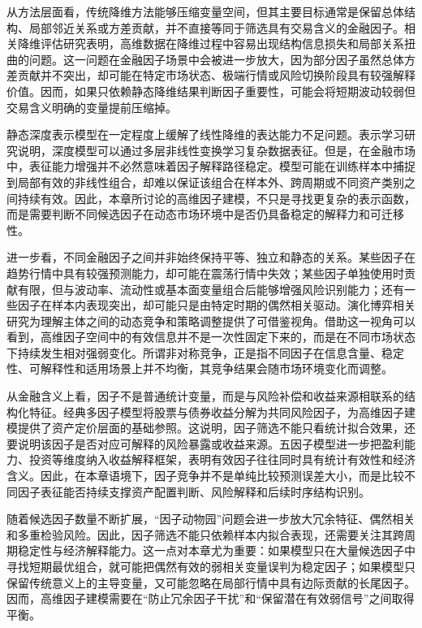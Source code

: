 从方法层面看，传统降维方法能够压缩变量空间，但其主要目标通常是保留总体结构、局部邻近关系或方差贡献，并不直接等同于筛选具有交易含义的金融因子。相关降维评估研究表明，高维数据在降维过程中容易出现结构信息损失和局部关系扭曲的问题\cite{espadoto2019toward}。这一问题在金融因子场景中会被进一步放大，因为部分因子虽然总体方差贡献并不突出，却可能在特定市场状态、极端行情或风险切换阶段具有较强解释价值。因而，如果只依赖静态降维结果判断因子重要性，可能会将短期波动较弱但交易含义明确的变量提前压缩掉。

静态深度表示模型在一定程度上缓解了线性降维的表达能力不足问题。表示学习研究说明，深度模型可以通过多层非线性变换学习复杂数据表征\cite{bengio2013representation}。但是，在金融市场中，表征能力增强并不必然意味着因子解释路径稳定。模型可能在训练样本中捕捉到局部有效的非线性组合，却难以保证该组合在样本外、跨周期或不同资产类别之间持续有效。因此，本章所讨论的高维因子建模，不只是寻找更复杂的表示函数，而是需要判断不同候选因子在动态市场环境中是否仍具备稳定的解释力和可迁移性。

进一步看，不同金融因子之间并非始终保持平等、独立和静态的关系。某些因子在趋势行情中具有较强预测能力，却可能在震荡行情中失效；某些因子单独使用时贡献有限，但与波动率、流动性或基本面变量组合后能够增强风险识别能力；还有一些因子在样本内表现突出，却可能只是由特定时期的偶然相关驱动。演化博弈相关研究为理解主体之间的动态竞争和策略调整提供了可借鉴视角\cite{chang2025survey}。借助这一视角可以看到，高维因子空间中的有效信息并不是一次性固定下来的，而是在不同市场状态下持续发生相对强弱变化。所谓非对称竞争，正是指不同因子在信息含量、稳定性、可解释性和适用场景上并不均衡，其竞争结果会随市场环境变化而调整。

从金融含义上看，因子不是普通统计变量，而是与风险补偿和收益来源相联系的结构化特征。经典多因子模型将股票与债券收益分解为共同风险因子，为高维因子建模提供了资产定价层面的基础参照\cite{fama1993common}。这说明，因子筛选不能只看统计拟合效果，还要说明该因子是否对应可解释的风险暴露或收益来源。五因子模型进一步把盈利能力、投资等维度纳入收益解释框架，表明有效因子往往同时具有统计有效性和经济含义\cite{fama2014five}。因此，在本章语境下，因子竞争并不是单纯比较预测误差大小，而是比较不同因子表征能否持续支撑资产配置判断、风险解释和后续时序结构识别。

随着候选因子数量不断扩展，“因子动物园”问题会进一步放大冗余特征、偶然相关和多重检验风险。因此，因子筛选不能只依赖样本内拟合表现，还需要关注其跨周期稳定性与经济解释能力\cite{feng2020taming}。这一点对本章尤为重要：如果模型只在大量候选因子中寻找短期最优组合，就可能把偶然有效的弱相关变量误判为稳定因子；如果模型只保留传统意义上的主导变量，又可能忽略在局部行情中具有边际贡献的长尾因子。因而，高维因子建模需要在“防止冗余因子干扰”和“保留潜在有效弱信号”之间取得平衡。

